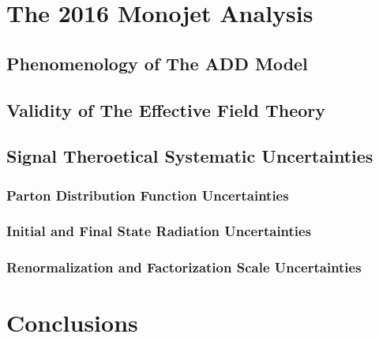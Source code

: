 \documentclass[10pt,twoside,cucitura,classica,english,openany]{toptesi}
\begin{document}


\chapter{The 2016 Monojet Analysis}
\label{cha:2016-monoj-analys}

\section{Phenomenology of The ADD Model}
\label{sec:phen-add-model}



\section{Validity of The Effective Field Theory}
\label{sec:valid-effect-field}



\section{Signal Theroetical Systematic Uncertainties}
\label{sec:ther-syst-uncert}



\subsection{Parton Distribution Function Uncertainties}
\label{sec:pdf-uncertainties}



\subsection{Initial and Final State Radiation Uncertainties}
\label{sec:tune-uncertainties}



\subsection{Renormalization and Factorization Scale Uncertainties}
\label{sec:renorm-fact-scale}



\chapter{Conclusions}
\label{cha:conclusions}



\printglossaries

 \printbibliography
\end{document}
